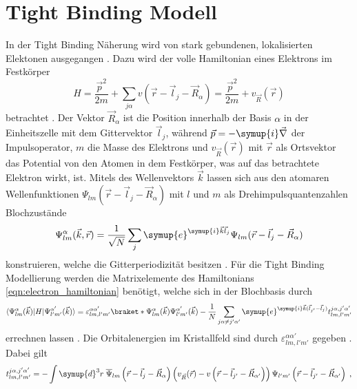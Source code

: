 \section{Tight Binding Modell}
\label{sec:tightbinding}
In der Tight Binding Näherung wird von stark gebundenen, lokalisierten Elektonen ausgegangen \cite{Czycholl}.
Dazu wird der volle Hamiltonian eines Elektrons im Festkörper
\begin{equation}
    H = \frac{\vec{p}^2}{2m} + \sum_{j\alpha} v(\vec{r}-\vec{l}_j - \vec{R}_{\alpha}) = \frac{\vec{p}^2}{2m} + v_{\vec{R}}(\vec{r})\label{eqn:electron_hamiltonian}
\end{equation}
betrachtet \cite{Czycholl}.
Der Vektor $\vec{R}_{\alpha}$ ist die Position innerhalb der Basis $\alpha$ in der Einheitszelle mit dem Gittervektor $\vec{l}_j$, während
$\vec{p} = -\symup{i}\vec{\nabla}$ der Impulsoperator, $m$ die Masse des Elektrons und $v_{\vec{R}}(\vec{r})$ mit $\vec{r}$ als Ortsvektor das Potential von den Atomen in dem Festkörper, 
was auf das betrachtete Elektron wirkt, ist.
Mitels des Wellenvektors $\vec{k}$ lassen sich aus den atomaren Wellenfunktionen $\Psi_{lm} \left (\vec{r}-\vec{l}_j - \vec{R}_{\alpha} \right )$ mit $l$ und $m$ als Drehimpulsquantenzahlen
Blochzustände
\begin{equation}
    \Psi^{\alpha}_{lm}(\vec{k}, \vec{r}) = \frac{1}{\sqrt{N}} \sum_{j} \symup{e}^{\symup{i}\vec{k}\vec{l}_j} \Psi_{lm}(\vec{r}-\vec{l}_j - \vec{R}_{\alpha}) 
\end{equation}
konstruieren, welche die Gitterperiodizität besitzen \cite{SC_literature}.
Für die Tight Binding Modellierung werden die Matrixelemente des Hamiltonians \eqref{eqn:electron_hamiltonian}
benötigt, welche sich in der Blochbasis durch
\begin{equation*}
    \bra{\Psi^{\alpha}_{lm}(\vec{k})} H \ket{\Psi^{\alpha'}_{l'm'}(\vec{k})} = \varepsilon_{lm,l'm'}^{\alpha \alpha'} \braket*{\Psi^{\alpha}_{lm}(\vec{k})}{\Psi^{\alpha'}_{l'm'}(\vec{k})}
    - \frac{1}{N} \sum_{j\alpha \neq j' \alpha'} \symup{e}^{\symup{i}\vec{k}(\vec{l}_{j'}-\vec{l}_{j})}  t^{j\alpha,j'\alpha'}_{lm,l'm'}
\end{equation*}
errechnen lassen \cite{SC_literature}\cite{Czycholl}.
Die Orbitalenergien im Kristallfeld sind durch $\varepsilon_{lm,l'm'}^{\alpha \alpha'}$ gegeben \cite{SC_literature}.
Dabei gilt
\begin{equation*}
    t^{j\alpha,j'\alpha'}_{lm,l'm'} = - \int \symup{d}^3r \; \overline{\Psi}_{lm} \left (\vec{r}-\vec{l}_j - \vec{R}_{\alpha} \right ) 
    \left ( v_{\vec{R}} (\vec{r}) - v \left (\vec{r} - \vec{l}_{j'} - \vec{R}_{\alpha'} \right )   \right ) \Psi_{l'm'} \left (\vec{r}-\vec{l}_{j'} - \vec{R}_{\alpha'} \right )  \; ,
\end{equation*}
